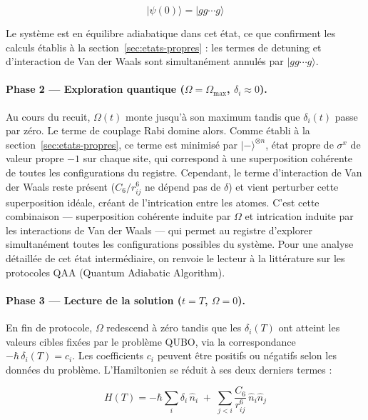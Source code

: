 \documentclass{ceri/sty/rapport}
\begin{document}
\begin{equation}
|\psi(0)\rangle = |gg\cdots g\rangle
\end{equation}

Le système est en équilibre adiabatique dans cet état, ce que confirment les calculs établis
à la section~\ref{sec:etats-propres} : les termes de detuning et d'interaction de Van der Waals sont
simultanément annulés par $|gg\cdots g\rangle$.

\paragraph{Phase 2 --- Exploration quantique ($\Omega = \Omega_{\max}$, $\delta_i \approx 0$).}

Au cours du recuit, $\Omega(t)$ monte jusqu'à son maximum tandis que $\delta_i(t)$ passe par zéro.
Le terme de couplage Rabi domine alors. Comme établi à la section~\ref{sec:etats-propres}, ce terme
est minimisé par $|{-}\rangle^{\otimes n}$, état propre de $\sigma^x$ de valeur propre $-1$ sur chaque
site, qui correspond à une superposition cohérente de toutes les configurations du registre. Cependant, le terme d'interaction de
Van der Waals reste présent ($C_6/r_{ij}^6$ ne dépend pas de $\delta$) et vient perturber cette
superposition idéale, créant de l'intrication entre les atomes. C'est cette combinaison —
superposition cohérente induite par $\Omega$ et intrication induite par les interactions de Van der
Waals — qui permet au registre d'explorer simultanément toutes les configurations possibles du
système. Pour une analyse détaillée de cet état intermédiaire, on renvoie le lecteur à la
littérature sur les protocoles QAA (Quantum Adiabatic Algorithm).

\paragraph{Phase 3 --- Lecture de la solution ($t = T$, $\Omega = 0$).}

En fin de protocole, $\Omega$ redescend à zéro tandis que les $\delta_i(T)$ ont atteint les
valeurs cibles fixées par le problème QUBO, via la correspondance $-\hbar\,\delta_i(T) = c_i$.
Les coefficients $c_i$ peuvent être positifs ou négatifs selon les données du problème.
L'Hamiltonien se réduit à ses deux derniers termes :

\begin{equation}
H(T) = -\hbar \sum_i \delta_i\,\hat{n}_i \;+\; \sum_{j<i} \frac{C_6}{r_{ij}^6}\,\hat{n}_i \hat{n}_j
\end{equation}
\end{document}

